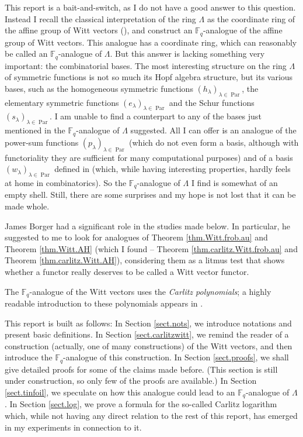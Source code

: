 \documentclass[numbers=enddot,12pt,final,onecolumn,notitlepage]{scrartcl}%
\theoremstyle{definition}
\begin{document}
This report is a bait-and-switch, as I do not have a good answer to this
question. Instead I recall the classical interpretation of the ring $\Lambda$
as the coordinate ring of the affine group of Witt vectors (\cite[\S 9--\S 10]%
{hw-witt1}), and construct an $\mathbb{F}_{q}$-analogue of the affine group of
Witt vectors. This analogue has a coordinate ring, which can reasonably be
called an $\mathbb{F}_{q}$-analogue of $\Lambda$. But this answer is lacking
something very important: the combinatorial bases. The most interesting
structure on the ring $\Lambda$ of symmetric functions is not so much its Hopf
algebra structure, but its various bases, such as the homogeneous symmetric
functions $\left(  h_{\lambda}\right)  _{\lambda\in\operatorname*{Par}}$, the
elementary symmetric functions $\left(  e_{\lambda}\right)  _{\lambda
\in\operatorname*{Par}}$ and the Schur functions $\left(  s_{\lambda}\right)
_{\lambda\in\operatorname*{Par}}$. I am unable to find a counterpart to any of
the bases just mentioned in the $\mathbb{F}_{q}$-analogue of $\Lambda$
suggested. All I can offer is an analogue of the power-sum functions $\left(
p_{\lambda}\right)  _{\lambda\in\operatorname*{Par}}$ (which do not even form
a basis, although with functoriality they are sufficient for many
computational purposes) and of a basis $\left(  w_{\lambda}\right)
_{\lambda\in\operatorname*{Par}}$ defined in \cite[Exercise 2.9.3
(c)]{reiner-hopf} (which, while having interesting properties, hardly feels at
home in combinatorics). So the $\mathbb{F}_{q}$-analogue of $\Lambda$ I find
is somewhat of an empty shell. Still, there are some surprises and my hope is
not lost that it can be made whole.

James Borger had a significant role in the studies made below. In particular,
he suggested to me to look for analogues of Theorem \ref{thm.Witt.frob.au} and
Theorem \ref{thm.Witt.AH} (which I found -- Theorem
\ref{thm.carlitz.Witt.frob.au} and Theorem \ref{thm.carlitz.Witt.AH}),
considering them as a litmus test that shows whether a functor really deserves
to be called a Witt vector functor.

The $\mathbb{F}_{q}$-analogue of the Witt vectors uses the \textit{Carlitz
polynomials}; a highly readable introduction to these polynomials appears in
\cite{kc-carlitz}.

This report is built as follows: In Section \ref{sect.nots}, we introduce
notations and present basic definitions. In Section \ref{sect.carlitzwitt}, we
remind the reader of a construction (actually, one of many constructions) of
the Witt vectors, and then introduce the $\mathbb{F}_{q}$-analogue of this
construction. In Section \ref{sect.proofs}, we shall give detailed proofs for
some of the claims made before. (This section is still under construction, so
only few of the proofs are available.) In Section \ref{sect.tinfoil}, we
speculate on how this analogue could lead to an $\mathbb{F}_{q}$-analogue of
$\Lambda$. In Section \ref{sect.log}, we prove a formula for the so-called
Carlitz logarithm which, while not having any direct relation to the rest of
this report, has emerged in my experiments in connection to it.
\end{document}
